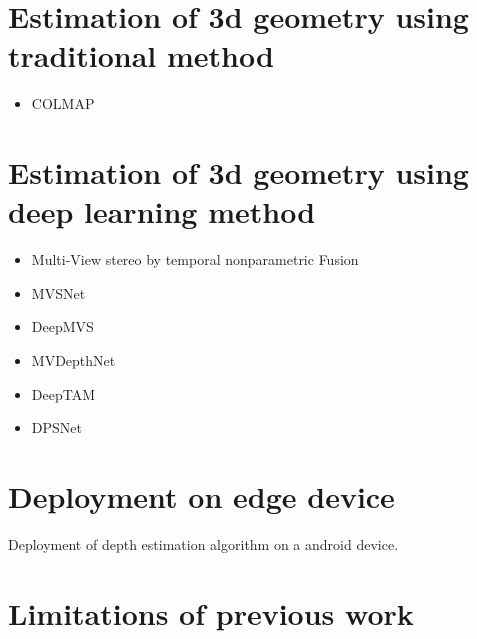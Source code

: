     \section{Estimation of 3d geometry using traditional method}
    \begin{itemize}
    	\item COLMAP
    \end{itemize}

    \section{Estimation of 3d geometry using deep learning method}
    \begin{itemize}
    	\item Multi-View stereo by temporal nonparametric Fusion 
    	\item MVSNet
    	\item DeepMVS
    	\item MVDepthNet
    	\item DeepTAM
    	\item DPSNet
    \end{itemize}
	
	\section{Deployment on edge device}
	Deployment of depth estimation algorithm on a android device.
	
    \section{Limitations of previous work}
    

